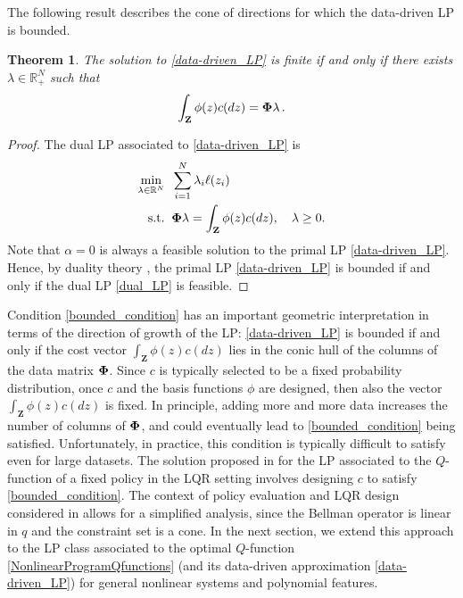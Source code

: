 \documentclass[journal,twoside,web]{ieeecolor}
\newtheorem{thm}{Theorem}
\newcommand{\Zb}{\mathbf{Z}}
\newcommand{\review}{\color{black}}
\begin{document}
The following result describes the cone of directions for which the data-driven LP is bounded.

\begin{thm} \label{mainthm}
	The solution to \eqref{data-driven_LP} is finite if and only if there exists $\lambda\in\mathbb{R}^{N}_+$ such that
	\begin{equation} \label{bounded_condition}
	\int_{\Zb} \phi (z) c(dz) = \bold\Phi \lambda\,.
	\end{equation}
% 
\end{thm}
\vspace{0.4cm}
\begin{proof}
	The dual LP associated to \eqref{data-driven_LP} is \cite[Ch.6]{matouvsek2007understanding} 
	\begin{equation} \label{dual_LP}
		\begin{aligned} 
			\min_{\lambda \in \mathbb{R}^N} \;\; & \sum_{i=1}^{N} \lambda_i \ell(z_i) \\
			\text{s.t.} \;\; & \bold\Phi \lambda = \int_{\Zb} \phi (z) c(dz), \quad \lambda \ge 0.
		\end{aligned} 
	\end{equation} 
%
Note that $\alpha=0$ is always a feasible solution to the primal LP \eqref{data-driven_LP}. Hence, by duality theory \cite[Ch.6]{matouvsek2007understanding}, the primal LP \eqref{data-driven_LP} is bounded if and only if the dual LP \eqref{dual_LP} is feasible.
\end{proof}

Condition \eqref{bounded_condition} has an important geometric interpretation in terms of the direction of growth of the LP: \eqref{data-driven_LP} is bounded if and only if the cost vector $\int_{\Zb} \phi (z) c(dz)$ lies in the conic hull of the columns of the data matrix $\bold\Phi$. Since $c$ is typically selected to be a fixed probability distribution, once $c$ and the basis functions $\phi$ are designed, then also the vector $\int_{\Zb} \phi (z) c(dz)$ is fixed. In principle, adding more and more data increases the number of columns of $\bold\Phi$, and could eventually lead to \eqref{bounded_condition} being satisfied. Unfortunately, in practice, this condition is typically difficult to satisfy even for large datasets. {\review The solution proposed in \cite{LuciaBounded} for the LP associated to the $Q$-function of a fixed policy in the LQR setting involves designing $c$ to satisfy \eqref{bounded_condition}. The context of policy evaluation and LQR design considered in \cite{LuciaBounded} allows for a simplified analysis, since the Bellman operator is linear in $q$ and the constraint set is a cone. In the next section, we extend this approach to the LP class associated to the optimal $Q$-function \eqref{NonlinearProgramQfunctions} (and its data-driven approximation \eqref{data-driven_LP}) for general nonlinear systems and polynomial features.}
\end{document}
